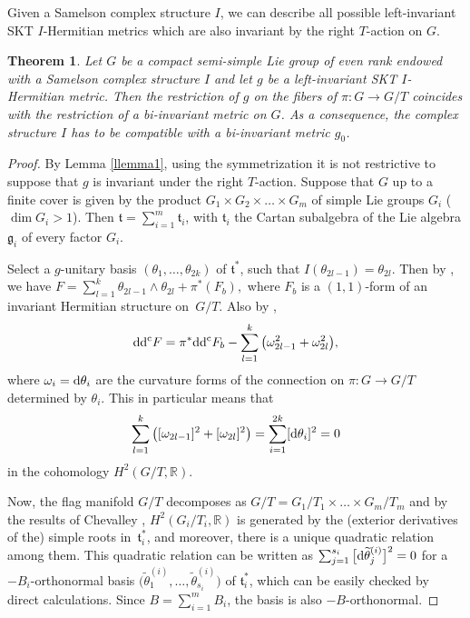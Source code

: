 \documentclass[10pt,a4paper]{amsart}
\numberwithin{equation}{section}
\newtheorem{Theorem}{Theorem}[section]
\begin{document}
Given a Samelson complex structure $I$, we can describe all possible left-invariant SKT $I$-Hermitian metrics which are also invariant by the right $T$-action on $G$.


\begin{Theorem}\label{lemma2}
Let $G$ be a compact semi-simple Lie group of even rank endowed with a Samelson complex structure $I$ and let $g$ be a left-invariant SKT $I$-Hermitian metric.
Then the restriction of $g$ on the fibers of $\pi\colon G \rightarrow G/T$ coincides with the restriction of a bi-invariant metric on $G$. As a consequence, the complex structure $I$ has to be compatible with a bi-invariant metric $g_0$.
\end{Theorem}



\begin{proof} By Lemma \ref{llemma1}, using the symmetrization it is not restrictive to suppose that $g$ is invariant under the right $T$-action.
 Suppose that $G$ up to a finite cover is given by the product $G_1\times G_2\times \dots \times G_m$ of simple Lie groups $G_i$ ($ \dim G_i > 1$). Then $\mathfrak t = \sum_{i = 1}^m \mathfrak t_i$, with $\mathfrak t_i$ the Cartan subalgebra of the Lie algebra $\mathfrak g_i$ of every factor $G_i$.


Select a $g$-unitary basis $(\theta_1, \dots , \theta_{2k})$ of $\mathfrak t^*$, such that $ I(\theta_{2l-1})=\theta_{2l}$.
Then by \cite{GGP}, we have $F = \sum_{l = 1}^k \theta_{2l-1}\wedge\theta_{2l} + \pi^*(F_b),$ where $F_b$ is a $(1,1)$-form of an invariant Hermitian structure on~$G/T$. Also by \cite[Section~5]{GGP},
\[
{\rm d}{\rm d}^{\rm c} F = \pi^*{\rm d}{\rm d}^{\rm c} F_b - \sum_{l = 1}^k \big(\omega_{2l-1}^2+\omega_{2l}^2\big),
\]
 where $\omega_i = {\rm d}\theta_i$ are the curvature forms of the connection on $\pi\colon G\rightarrow G/T$ determined by $\theta_i$. This in particular means that
 \[
 \sum_{l=1}^k \big([\omega_{2l-1}]^2+[\omega_{2l}]^2\big) = \sum_{i=1}^{2k} [{\rm d}\theta_i]^2 = 0
 \]
 in the cohomology $H^2(G/T, \mathbb{R})$.

Now, the flag manifold $G/T$ decomposes as $G/T = G_1/T_1\times\dots \times G_m/T_m$ and by the results of Chevalley \cite{Chevalley}, $H^2(G_i/T_i, \mathbb{R})$ is generated by the (exterior derivatives of the) simple roots in~$\mathfrak t_i^*$, and moreover, there is a unique quadratic relation among them. This quadratic relation can be written as $\sum_{j=1}^{s_i} \big[{\rm d}\widetilde{\theta}^{(i)}_j\big]^2 = 0$ for
a $-B_i$-orthonormal basis $\big(\widetilde{\theta}^{(i)}_1, \dots, \widetilde{\theta}^{(i)}_{s_i}\big)$ of $\mathfrak t_i^*$, which can be easily checked by direct calculations. Since $B =\sum_{i =1}^m B_i$, the basis is also $-B$-orthonormal.


\end{proof}
\end{document}
